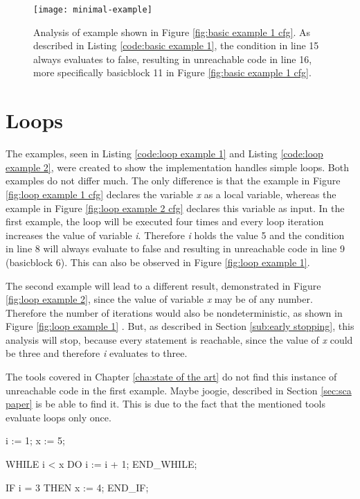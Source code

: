 \begin{figure}[h!]
	\centering
	\texttt{[image: minimal-example]}
	\caption{Analysis of example shown in Figure \ref{fig:basic example 1 cfg}. As described in Listing \ref{code:basic example 1}, the condition in line 15 always evaluates to false, resulting in unreachable code in line 16, more specifically basicblock 11 in Figure \ref{fig:basic example 1 cfg}. }
	\label{fig:basic example 1}
\end{figure}

\section{Loops}
\label{sec:loops}
The examples, seen in Listing \ref{code:loop example 1} and Listing \ref{code:loop example 2}, were created to show the implementation handles simple loops. Both examples do not differ much. The only difference is that the example in Figure \ref{fig:loop example 1 cfg} declares the variable \emph{x} as a local variable, whereas the example in Figure \ref{fig:loop example 2 cfg} declares this variable as input. 
In the first example, the loop will be executed four times and every loop iteration increases the value of variable \emph{i}. Therefore \emph{i} holds the value 5 and the condition in line 8 will always evaluate to false and resulting in unreachable code in line 9 (basicblock 6). This can also be observed in Figure \ref{fig:loop example 1}.


The second example will lead to a different result, demonstrated in Figure \ref{fig:loop example 2}, since the value of variable \emph{x} may be of any number. Therefore the number of iterations would also be nondeterministic, as shown in Figure \ref{fig:loop example 1} . But, as described in Section \ref{sub:early stopping}, this analysis will stop, because every statement is reachable, since the value of \emph{x} could be three and therefore \emph{i} evaluates to three. 


The tools covered in Chapter \ref{cha:state of the art} do not find this instance of unreachable code in the first example. Maybe joogie, described in Section \ref{sec:sca paper} is be able to find it. This is due to the fact that the mentioned tools evaluate loops only once.

\begin{program}[h!]
		\begin{GenericCode}
i := 1;
x := 5;
		
WHILE i < x DO
	i := i + 1;
END_WHILE;
		
IF i = 3 THEN
	x := 4;
END_IF;	\end{GenericCode}
\centering
\caption{A simple loop that increments a number. Since \emph{i} is dependent on the iterations, which are limited by and will be equal to \emph{x}, in this case 5, the condition in line 8 will never evaluate true.}
\label{code:loop example 1}
\end{program}

